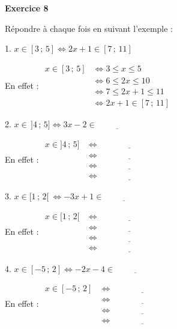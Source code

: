 \documentclass[a4paper,11pt]{article}
\newenvironment{exercice}[1]{%
  \Needspace{6\baselineskip}\par\bigskip\noindent\textbf{Exercice #1}\par\smallskip\noindent\ignorespaces
}{%
  \par
}
\newcommand{\chainevide}[1]{%
  En effet : $\begin{array}{rl}
    x\in #1 & \Leftrightarrow \underline{\hspace{3cm}}\\
    & \Leftrightarrow \underline{\hspace{3cm}}\\
    & \Leftrightarrow \underline{\hspace{3cm}}\\
    & \Leftrightarrow \underline{\hspace{3cm}}
  \end{array}$%
}
\begin{document}
\begin{exercice}{8}
Répondre à chaque fois en suivant l'exemple :

\medskip
\noindent
\begin{minipage}[t]{0.48\textwidth}
1. $x\in[3\,;\,5]\Leftrightarrow 2x+1\in[7\,;\,11]$

\smallskip
En effet : $\begin{array}{rl}
  x\in[3\,;\,5] & \Leftrightarrow 3\leq x\leq 5\\
  & \Leftrightarrow 6\leq 2x\leq 10\\
  & \Leftrightarrow 7\leq 2x+1\leq 11\\
  & \Leftrightarrow 2x+1\in[7\,;\,11]
\end{array}$
\end{minipage}
\hfill
\begin{minipage}[t]{0.48\textwidth}
2. $x\in\,]4\,;\,5]\Leftrightarrow 3x-2\in\underline{\hspace{2cm}}$

\smallskip
\chainevide{]4\,;\,5]}
\end{minipage}

\bigskip
\noindent
\begin{minipage}[t]{0.48\textwidth}
3. $x\in[1\,;\,2[\ \Leftrightarrow -3x+1\in\underline{\hspace{2cm}}$

\smallskip
\chainevide{[1\,;\,2[}
\end{minipage}
\hfill
\begin{minipage}[t]{0.48\textwidth}
4. $x\in[-5\,;\,2]\Leftrightarrow -2x-4\in\underline{\hspace{2cm}}$

\smallskip
\chainevide{[-5\,;\,2]}
\end{minipage}
\end{exercice}
\end{document}
